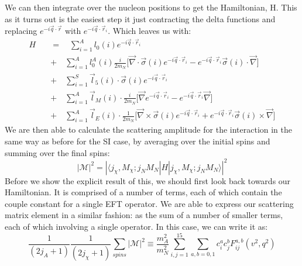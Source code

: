 \par
We can then integrate over the nucleon positions to get the Hamiltonian, H.
This as it turns out is the easiest step it just contracting the delta functions and replacing $e^{-i\vec{q}\cdot \vec{r}}$ with $e^{-i\vec{q}\cdot \vec{r}_i}$.
Which leaves us with:
\begin{equation}
\begin{split}
    H\quad & =\quad \sum^{A}_{i=1} l_{0}(i) e^{-i\vec{q}\cdot \vec{r}_i} \\
           & +\quad \sum^{A}_{i=1} l^A_0 (i) \frac{i}{2m_N} \Bigg[ \vec{\nabla} \cdot \vec{\sigma}(i) e^{-i\vec{q}\cdot \vec{r}_i} - e^{-i\vec{q}\cdot \vec{r}_i} \vec{\sigma}(i) \cdot \vec{\nabla} \Bigg] \\
           & +\quad \sum^{S}_{i=1} \vec{l}_5 (i) \cdot \vec{\sigma}(i) e^{-i\vec{q}\cdot \vec{r}_i} \\
           & +\quad \sum^{A}_{i=1} \vec{l}_M (i) \cdot \frac{i}{2m_N} \Bigg[ \vec{\nabla} e^{-i\vec{q}\cdot \vec{r}_i} - e^{-i\vec{q}\cdot \vec{r}_i}\vec{\nabla} \Bigg] \\
           & +\quad \sum^{A}_{i=1} \vec{l}_E (i) \cdot \frac{1}{2m_N} \Bigg[ \vec{\nabla} \times \vec{\sigma}(i)e^{-i\vec{q}\cdot \vec{r}_i} + e^{-i\vec{q}\cdot \vec{r}_i} \vec{\sigma}(i) \times \vec{\nabla} \Bigg]
\end{split}
\label{eq:eft_hamiltonian}
\end{equation}
We are then able to calculate the scattering amplitude for the interaction in the same way as before for the SI case, by averaging over the initial spins and summing over the final spins:
\begin{equation}
    | \mathcal{M} |^2  = |\langle j_\chi,M_\chi;j_N M_N | H | j_\chi,M_\chi;j_N M_N \rangle |^2
\end{equation}
Before we show the explicit result of this, we should first look back towards our Hamiltonian.
It is comprised of a number of terms, each of which contain the couple constant for a single EFT operator.
We are able to express our scattering matrix element in a similar fashion: as the sum of a number of smaller terms, each of which involving a single operator.
In this case, we can write it as:
\begin{equation}
    \frac{1}{(2j_A + 1)}\frac{1}{(2j_\chi + 1)} \sum_{spins} |\mathcal{M}|^2 \equiv
    \frac{m_A^2}{m_N^2} \sum_{i,j=1}^{15} \sum_{a,b=0,1} c_i^{a}c_{j}^{b} F_{ij}^{a,b} (v^2,q^2)
    \label{eq:eft_scattering_amplitude_in_terms_of_operator_form_factors}
\end{equation}
